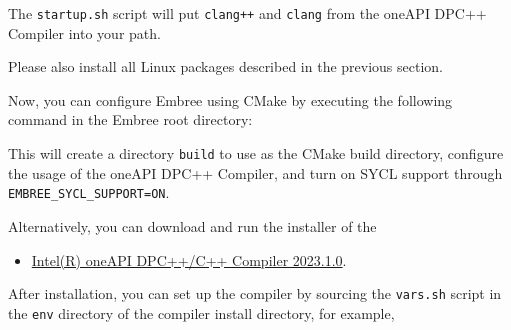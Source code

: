 \begin{Shaded}
\begin{Highlighting}[]
\OperatorTok{:}
\OperatorTok{{-}}
\OperatorTok{/}
\end{Highlighting}
\end{Shaded}

The \texttt{startup.sh} script will put \texttt{clang++} and
\texttt{clang} from the oneAPI DPC++ Compiler into your path.

Please also install all Linux packages described in the previous
section.

Now, you can configure Embree using CMake by executing the following
command in the Embree root directory:

\begin{Shaded}
\begin{Highlighting}[]
\OperatorTok{{-}}
      \OperatorTok{{-}}\OperatorTok{=}\OperatorTok{++}\NormalTok{ \textbackslash{}}
      \OperatorTok{{-}}\OperatorTok{=}
      \OperatorTok{{-}}\OperatorTok{=}
\end{Highlighting}
\end{Shaded}

This will create a directory \texttt{build} to use as the CMake build
directory, configure the usage of the oneAPI DPC++ Compiler, and turn on
SYCL support through \texttt{EMBREE\_SYCL\_SUPPORT=ON}.

Alternatively, you can download and run the installer of the

\begin{itemize}
\tightlist
\item
  \href{https://www.intel.com/content/www/us/en/developer/articles/tool/oneapi-standalone-components.html\#dpcpp-cpp}{Intel(R)
  oneAPI DPC++/C++ Compiler 2023.1.0}.
\end{itemize}

After installation, you can set up the compiler by sourcing the
\texttt{vars.sh} script in the \texttt{env} directory of the compiler
install directory, for example,

